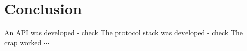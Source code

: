\chapter{Conclusion}\label{chap:conclusion}
An API was developed - check
The protocol stack was developed - check
The crap worked $\cdots$